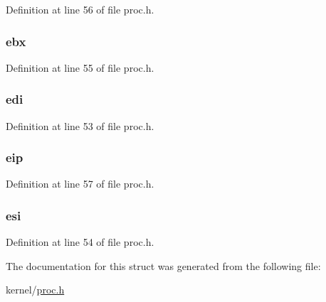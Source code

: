 Definition at line 56 of file proc.\-h.

\hypertarget{structcontext_a685d686dce7abed5d536f3304c4692b9}{
\subsubsection[{ebx}]{ ebx}}\label{structcontext_a685d686dce7abed5d536f3304c4692b9}


Definition at line 55 of file proc.\-h.

\hypertarget{structcontext_a5d017b35dd2b40671e27c7ae6c276b23}{
\subsubsection[{edi}]{ edi}}\label{structcontext_a5d017b35dd2b40671e27c7ae6c276b23}


Definition at line 53 of file proc.\-h.

\hypertarget{structcontext_ae590d07d633d3642402cd0b25e053568}{
\subsubsection[{eip}]{ eip}}\label{structcontext_ae590d07d633d3642402cd0b25e053568}


Definition at line 57 of file proc.\-h.

\hypertarget{structcontext_ab40e0917bb6e7e462049fc4151201f0a}{
\subsubsection[{esi}]{ esi}}\label{structcontext_ab40e0917bb6e7e462049fc4151201f0a}


Definition at line 54 of file proc.\-h.



The documentation for this struct was generated from the following file\-:\begin{DoxyCompactItemize}
\item 
kernel/\hyperlink{proc_8h}{proc.\-h}\end{DoxyCompactItemize}
